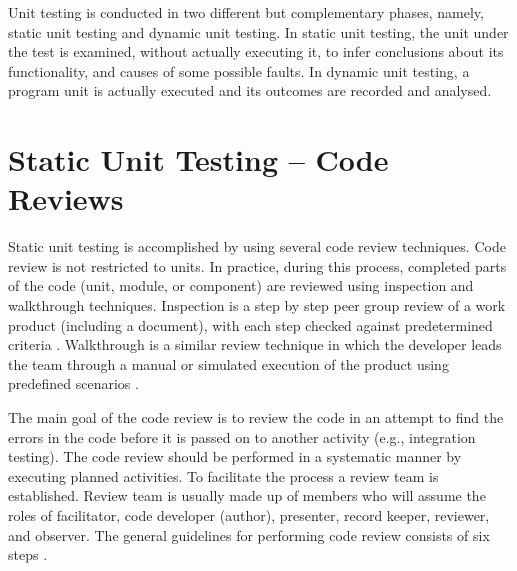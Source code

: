 \begin{Exercise}
\end{Exercise}

Unit testing is conducted in two different but complementary phases, namely, static unit testing and dynamic unit testing. In static unit testing, the unit under the test is examined, without actually executing it, to infer conclusions about its functionality, and causes of some possible faults. In dynamic unit testing, a program unit is actually executed and its outcomes are recorded and analysed.

\section{Static Unit Testing – Code Reviews}
Static unit testing is accomplished by using several code review techniques. Code review is not restricted to units. In practice, during this process, completed parts of the code (unit, module, or component) are reviewed using inspection and walkthrough techniques. Inspection is a step by step peer group review of a work product (including a document), with each step checked against predetermined criteria \autocite{fagan1999design}. Walkthrough is a similar review technique in which the developer leads the team through a manual or simulated execution of the product using predefined scenarios \autocite{yourdon1989structured}. 

The main goal of the code review is to review the code in an attempt to find the errors in the code before it is passed on to another activity (e.g., integration testing). The code review should be performed in a systematic manner by executing planned activities. To facilitate the process a review team is established. Review team is usually made up of members who will assume the roles of facilitator, code developer (author), presenter, record keeper, reviewer, and observer.
The general guidelines for performing code review consists of six steps \autocite{naik2011software}.

